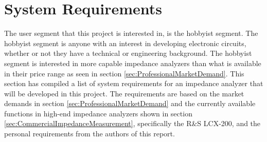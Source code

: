 \chapter{System Requirements} \label{ch:SystemRequirements}
The user segment that this project is interested in, is the hobbyist segment. The hobbyist segment is anyone with an interest in developing electronic circuits, whether or not they have a technical or engineering background. The hobbyist segment is interested in more capable impedance analyzers than what is available in their price range as seen in section \ref{sec:ProfessionalMarketDemand}. This section has compiled a list of system requirements for an impedance analyzer that will be developed in this project. The requirements are based on the market demands in section \ref{sec:ProfessionalMarketDemand} and the currently available functions in high-end impedance analyzers shown in section \ref{sec:CommercialImpedanceMeasurement}, specifically the R&S LCX-200, and the personal requirements from the authors of this report. 

